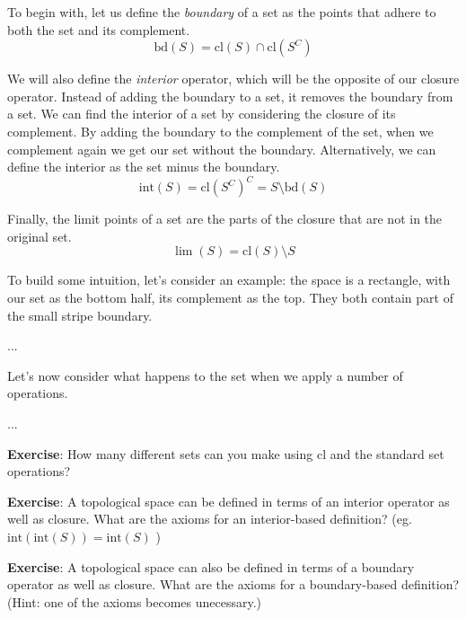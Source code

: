 \documentclass{report}
\newcommand{\cl}{\mathrm{cl}}
\newcommand{\intr}{\mathrm{int}}
\newcommand{\bd}{\mathrm{bd}}
\begin{document}
To begin with, let us define the \emph{boundary} of a set as the points that adhere to both the set and its complement. $$\bd(S) = \cl(S)∩\cl(S^C)$$

We will also define the \emph{interior} operator, which will be the opposite of our closure operator. Instead of adding the boundary to a set, it removes the boundary from a set. We can find the interior of a set by considering the closure of its complement. By adding the boundary to the complement of the set, when we complement again we get our set without the boundary. Alternatively, we can define the interior as the set minus the boundary. $$\intr(S) = \cl(S^C)^C = S \setminus \bd(S)$$

Finally, the limit points of a set are the parts of the closure that are not in the original set. $$\lim(S) = \cl(S) \setminus S$$

To build some intuition, let's consider an example: the space is a rectangle, with our set as the bottom half, its complement as the top. They both contain part of the small stripe boundary.

...

Let's now consider what happens to the set when we apply a number of operations.

...

{\bf Exercise}: How many different sets can you make using $\cl$ and the standard set operations? %

{\bf Exercise}: A topological space can be defined in terms of an interior operator as well as closure. What are the axioms for an interior-based definition? (eg. $\intr(\intr(S)) = \intr(S)$ )

{\bf Exercise}: A topological space can also be defined in terms of a boundary operator as well as closure. What are the axioms for a boundary-based definition? (Hint: one of the axioms becomes unecessary.)
\end{document}
